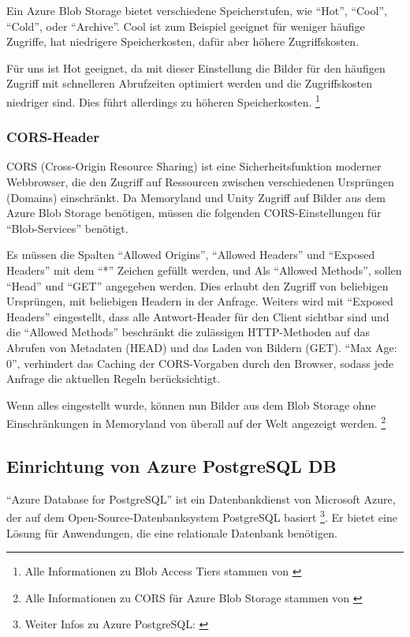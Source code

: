 Ein Azure Blob Storage bietet verschiedene Speicherstufen, wie ``Hot'', ``Cool'', ``Cold'',
oder ``Archive''. Cool ist zum Beispiel geeignet für weniger häufige Zugriffe, hat
niedrigere Speicherkosten, dafür aber höhere Zugriffskosten. 

Für uns ist Hot geeignet, da mit dieser Einstellung die Bilder für den häufigen 
Zugriff mit schnelleren Abrufzeiten optimiert werden und die Zugriffskosten niedriger sind. 
Dies führt allerdings zu höheren Speicherkosten. 
\footnote{Alle Informationen zu Blob Access Tiers stammen von \cite{MicrosoftCorporationb}}


\subsubsection{CORS-Header}

CORS (Cross-Origin Resource Sharing) ist eine Sicherheitsfunktion moderner Webbrowser, 
die den Zugriff auf Ressourcen zwischen verschiedenen Ursprüngen (Domains) einschränkt.
Da Memoryland und Unity Zugriff auf Bilder aus dem Azure Blob Storage benötigen, müssen
die folgenden CORS-Einstellungen für ``Blob-Services'' benötigt.

Es müssen die Spalten ``Allowed Origins'', ``Allowed Headers'' und ``Exposed Headers''
mit dem ``*'' Zeichen gefüllt werden, und Als ``Allowed Methods'', sollen ``Head'' und
``GET'' angegeben werden. Dies erlaubt den Zugriff von beliebigen Ursprüngen, mit beliebigen
Headern in der Anfrage. Weiters wird mit ``Exposed Headers'' eingestellt, dass alle 
Antwort-Header für den Client sichtbar sind und die ``Allowed Methods'' beschränkt die 
zulässigen HTTP-Methoden auf das Abrufen von Metadaten (HEAD) und das 
Laden von Bildern (GET). ``Max Age: 0'', verhindert das Caching der CORS-Vorgaben 
durch den Browser, sodass jede Anfrage die aktuellen Regeln berücksichtigt.

Wenn alles eingestellt wurde, können nun Bilder aus dem Blob Storage ohne Einschränkungen 
in Memoryland von überall auf der Welt angezeigt werden. 
\footnote{Alle Informationen zu CORS für Azure Blob Storage stammen von \cite{MicrosoftCorporationc}}


\subsection{Einrichtung von Azure PostgreSQL DB}

``Azure Database for PostgreSQL'' ist ein Datenbankdienst von Microsoft Azure, 
der auf dem Open-Source-Datenbanksystem PostgreSQL basiert 
\footnote{Weiter Infos zu Azure PostgreSQL: \cite{MicrosoftCorporationf}}. 
Er bietet eine Lösung für Anwendungen, die eine relationale Datenbank benötigen.

